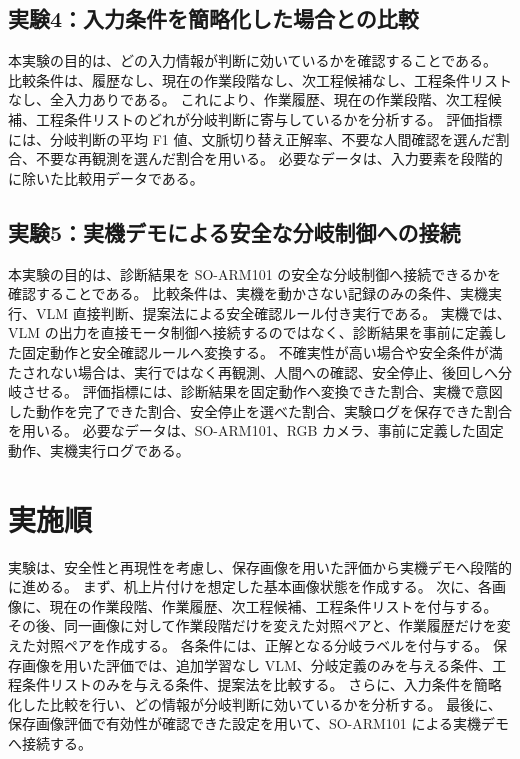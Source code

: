 \subsection{実験4：入力条件を簡略化した場合との比較}

本実験の目的は、どの入力情報が判断に効いているかを確認することである。
比較条件は、履歴なし、現在の作業段階なし、次工程候補なし、工程条件リストなし、全入力ありである。
これにより、作業履歴、現在の作業段階、次工程候補、工程条件リストのどれが分岐判断に寄与しているかを分析する。
評価指標には、分岐判断の平均 F1 値、文脈切り替え正解率、不要な人間確認を選んだ割合、不要な再観測を選んだ割合を用いる。
必要なデータは、入力要素を段階的に除いた比較用データである。

\subsection{実験5：実機デモによる安全な分岐制御への接続}

本実験の目的は、診断結果を SO-ARM101 の安全な分岐制御へ接続できるかを確認することである。
比較条件は、実機を動かさない記録のみの条件、実機実行、VLM 直接判断、提案法による安全確認ルール付き実行である。
実機では、VLM の出力を直接モータ制御へ接続するのではなく、診断結果を事前に定義した固定動作と安全確認ルールへ変換する。
不確実性が高い場合や安全条件が満たされない場合は、実行ではなく再観測、人間への確認、安全停止、後回しへ分岐させる。
評価指標には、診断結果を固定動作へ変換できた割合、実機で意図した動作を完了できた割合、安全停止を選べた割合、実験ログを保存できた割合を用いる。
必要なデータは、SO-ARM101、RGB カメラ、事前に定義した固定動作、実機実行ログである。

\section{実施順}

実験は、安全性と再現性を考慮し、保存画像を用いた評価から実機デモへ段階的に進める。
まず、机上片付けを想定した基本画像状態を作成する。
次に、各画像に、現在の作業段階、作業履歴、次工程候補、工程条件リストを付与する。
その後、同一画像に対して作業段階だけを変えた対照ペアと、作業履歴だけを変えた対照ペアを作成する。
各条件には、正解となる分岐ラベルを付与する。
保存画像を用いた評価では、追加学習なし VLM、分岐定義のみを与える条件、工程条件リストのみを与える条件、提案法を比較する。
さらに、入力条件を簡略化した比較を行い、どの情報が分岐判断に効いているかを分析する。
最後に、保存画像評価で有効性が確認できた設定を用いて、SO-ARM101 による実機デモへ接続する。

